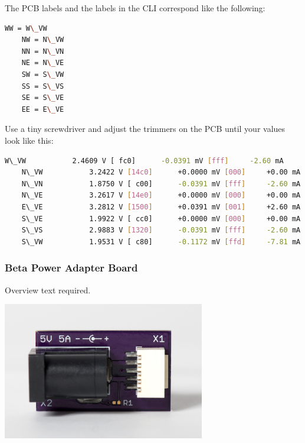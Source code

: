 The PCB labels and the labels in the CLI correspond like the following: 

\begin{lstlisting}[language=bash,morekeywords=$,keywordstyle=\bfseries,frame=none,xleftmargin=.25in,belowskip=2em, aboveskip=2em]
    WW = W\_VW
    NW = N\_VW
    NN = N\_VN
    NE = N\_VE
    SW = S\_VW
    SS = S\_VS
    SE = S\_VE
    EE = E\_VE
\end{lstlisting}

Use a tiny screwdriver and adjust the trimmers on the PCB until your values look like this:

\begin{lstlisting}[language=bash,morekeywords=$,keywordstyle=\bfseries,frame=none,xleftmargin=.25in,belowskip=2em, aboveskip=2em]
    W\_VW          	2.4609 V [ fc0] 	 -0.0391 mV [fff]     -2.60 mA
    N\_VW          	3.2422 V [14c0] 	 +0.0000 mV [000]     +0.00 mA
    N\_VN          	1.8750 V [ c00] 	 -0.0391 mV [fff]     -2.60 mA
    N\_VE          	3.2617 V [14e0] 	 +0.0000 mV [000]     +0.00 mA
    E\_VE          	3.2812 V [1500] 	 +0.0391 mV [001]     +2.60 mA
    S\_VE          	1.9922 V [ cc0] 	 +0.0000 mV [000]     +0.00 mA
    S\_VS          	2.9883 V [1320] 	 -0.0391 mV [fff]     -2.60 mA
    S\_VW          	1.9531 V [ c80] 	 -0.1172 mV [ffd]     -7.81 mA
\end{lstlisting}





\subsubsection{Beta Power Adapter Board}

Overview text required.

\begin{center}
\includegraphics[height=6cm]{images/Power-adapter-02}
\end{center}

